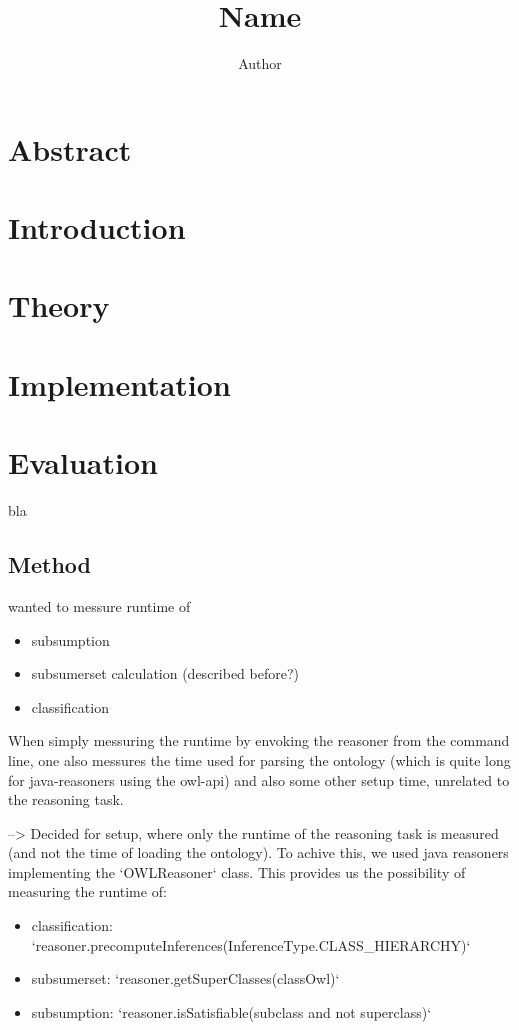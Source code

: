 \documentclass[a4paper]{article}
\author{Author}
\title{Name}
\begin{document}
\maketitle

\section*{Abstract}
\lipsum[1]

\section{Introduction}
\lipsum[2]

\section{Theory}
\lipsum[3]

\section{Implementation}
\lipsum[4]

\section{Evaluation}
bla

\subsection{Method}

wanted to messure runtime of
\begin{itemize}
	\item subsumption
	\item subsumerset calculation (described before?)
	\item classification
\end{itemize}


When simply messuring the runtime by envoking the reasoner from the command line, one also messures 
the time used for parsing the ontology (which is quite long for java-reasoners using the owl-api) and also
some other setup time, unrelated to the reasoning task.

-->
Decided for setup, where only the runtime of the reasoning task is measured (and not the time of loading the ontology).
To achive this, we used java reasoners implementing the `OWLReasoner` class. This provides us the possibility of measuring the 
runtime of:
\begin{itemize}
	\item classification: `reasoner.precomputeInferences(InferenceType.CLASS\_HIERARCHY)`
	\item subsumerset:    `reasoner.getSuperClasses(classOwl)`
	\item subsumption:    `reasoner.isSatisfiable(subclass and not superclass)`
\end{itemize}
\end{document}
